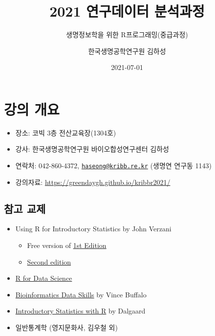 \documentclass[
]{book}
\title{2021 연구데이터 분석과정}
\subtitle{생명정보학을 위한 R프로그래밍(중급과정)}
\author{한국생명공학연구원 김하성}
\date{2021-07-01}
\providecommand{\tightlist}{%
  \setlength{\itemsep}{0pt}\setlength{\parskip}{0pt}}
\begin{document}
\maketitle

{
\setcounter{tocdepth}{1}
\tableofcontents
}
\hypertarget{introduction}{%
\chapter{강의 개요}\label{introduction}}

\begin{itemize}
\tightlist
\item
  장소: 코빅 3층 전산교육장(1304호)
\item
  강사: 한국생명공학연구원 바이오합성연구센터 김하성
\item
  연락처: 042-860-4372, \href{mailto:haseong@kribb.re.kr}{\nolinkurl{haseong@kribb.re.kr}} (생명연 연구동 1143)
\item
  강의자료: \url{https://greendaygh.github.io/kribbr2021/}
\end{itemize}

\hypertarget{References_n_books}{%
\section{참고 교제}\label{References_n_books}}

\begin{itemize}
\tightlist
\item
  Using R for Introductory Statistics by John Verzani

  \begin{itemize}
  \tightlist
  \item
    Free version of \href{https://cran.r-project.org/doc/contrib/Verzani-SimpleR.pdf}{1st Edition}
  \item
    \href{https://www.crcpress.com/Using-R-for-Introductory-Statistics-Second-Edition/Verzani/p/book/9781466590731}{Second edition}
  \end{itemize}
\item
  \href{https://r4ds.had.co.nz}{R for Data Science}
\item
  \href{http://2.droppdf.com/files/5aTvl/bioinformatics-data-skills.pdf}{Bioinformatics Data Skills} by Vince Buffalo
\item
  \href{http://www.academia.dk/BiologiskAntropologi/Epidemiologi/PDF/Introductory_Statistics_with_R__2nd_ed.pdf}{Introductory Statistics with R} by Dalgaard
\item
  일반통계학 (영지문화사, 김우철 외)
\end{itemize}
\end{document}
